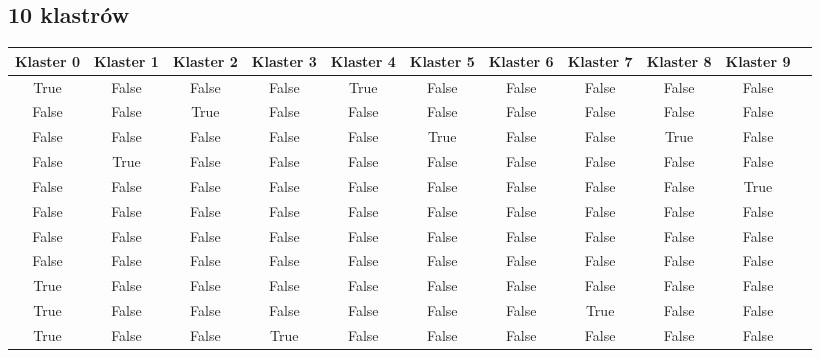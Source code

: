 \documentclass[../EDI_Task3_Karwowski_Kowalewski.tex]{subfiles}
\begin{document}
{{    }

    \subsection{10 klastrów}
    \label{results_k_10} {

        \begin{table}[!htbp]
            \scriptsize
            \centering
            \begin{tabular}{|c|c|c|c|c|c|c|c|c|c|c|}
                \hline
                Klaster 0 & Klaster 1 & Klaster 2 & Klaster 3 & Klaster 4 & Klaster 5 & Klaster 6 & Klaster 7 & Klaster 8 & Klaster 9 \\ \hline
                 True   &   False   &   False   &   False   &    True   &   False   &   False   &   False   &   False   &   False \\
                False   &   False   &    True   &   False   &   False   &   False   &   False   &   False   &   False   &   False \\
                False   &   False   &   False   &   False   &   False   &    True   &   False   &   False   &    True   &   False \\
                False   &    True   &   False   &   False   &   False   &   False   &   False   &   False   &   False   &   False \\
                False   &   False   &   False   &   False   &   False   &   False   &   False   &   False   &   False   &    True \\
                False   &   False   &   False   &   False   &   False   &   False   &   False   &   False   &   False   &   False \\
                False   &   False   &   False   &   False   &   False   &   False   &   False   &   False   &   False   &   False \\
                False   &   False   &   False   &   False   &   False   &   False   &   False   &   False   &   False   &   False \\
                 True   &   False   &   False   &   False   &   False   &   False   &   False   &   False   &   False   &   False \\
                 True   &   False   &   False   &   False   &   False   &   False   &   False   &    True   &   False   &   False \\
                 True   &   False   &   False   &    True   &   False   &   False   &   False   &   False   &   False   &   False \\

\end{tabular}
\end{table}}}
\end{document}
